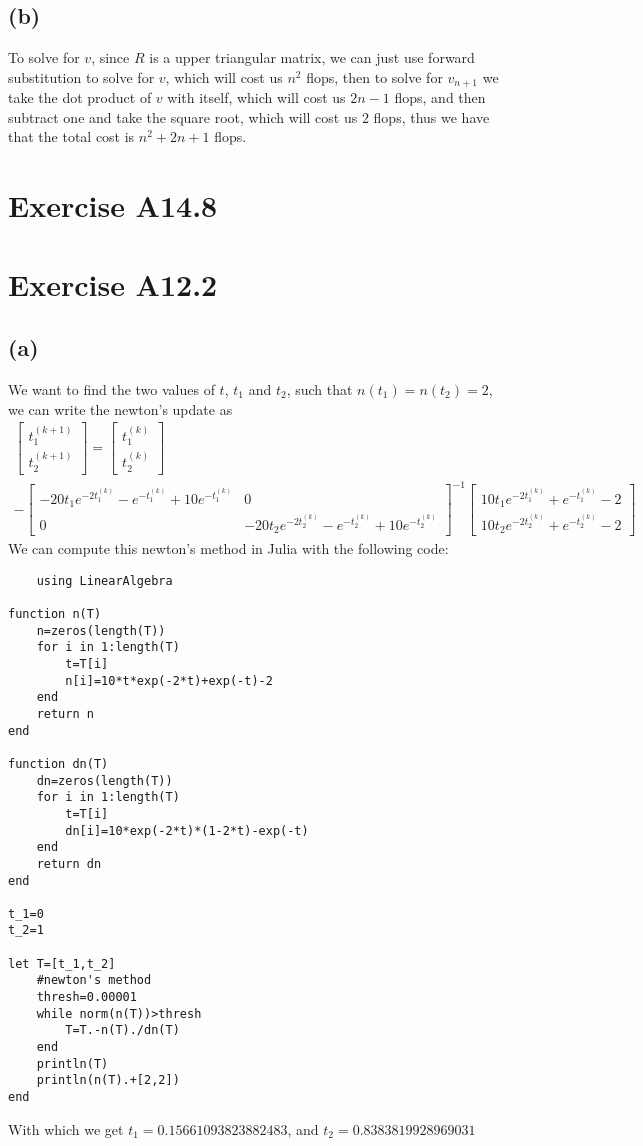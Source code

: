 \subsection*{(b)}
To solve for $v$, since $R$ is a upper triangular matrix, we can just use
forward substitution to solve for $v$, which will cost us $n^2$ flops, 
then to solve for $v_{n+1}$ we take the dot product of $v$ with itself,
which will cost us $2n-1$ flops, and then subtract one and take the square 
root, which will cost us $2$ flops, thus we have that the total cost is
$\boxed{n^2+2n+1}$ flops.
\section*{Exercise A14.8}

\section*{Exercise A12.2}
\subsection*{(a)}
We want to find the two values of $t$, $t_1$ and $t_2$, such that
$n(t_1)=n(t_2)=2$, we can write the newton's update as 
\begin{multline*}
    \begin{bmatrix}
    t_1^{(k+1)}\\
    t_2^{(k+1)}
\end{bmatrix}=\begin{bmatrix}
    t_1^{(k)}\\
    t_2^{(k)}
\end{bmatrix}\\-\begin{bmatrix}
    -20t_1e^{-2t_1^{(k)}}-e^{-t_1^{(k)}}+10e^{-t_1^{(k)}} & 0\\
    0 & -20t_2e^{-2t_2^{(k)}}-e^{-t_2^{(k)}}+10e^{-t_2^{(k)}}
\end{bmatrix}^{-1}\begin{bmatrix}
    10t_1e^{-2t_1^{(k)}}+e^{-t_1^{(k)}}-2\\
    10t_2e^{-2t_2^{(k)}}+e^{-t_2^{(k)}}-2
\end{bmatrix}
\end{multline*}
We can compute this newton's method in Julia with the following code:
\begin{verbatim}
    using LinearAlgebra

function n(T)
    n=zeros(length(T))
    for i in 1:length(T)
        t=T[i]
        n[i]=10*t*exp(-2*t)+exp(-t)-2
    end
    return n
end

function dn(T)
    dn=zeros(length(T))
    for i in 1:length(T)
        t=T[i]
        dn[i]=10*exp(-2*t)*(1-2*t)-exp(-t)
    end
    return dn
end

t_1=0
t_2=1

let T=[t_1,t_2]
    #newton's method 
    thresh=0.00001
    while norm(n(T))>thresh
        T=T.-n(T)./dn(T)
    end
    println(T)
    println(n(T).+[2,2])
end
\end{verbatim}
With which we get
$t_1=0.15661093823882483$, and $t_2=0.8383819928969031$
